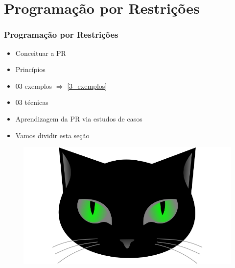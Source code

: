 
       
\section{Programação por Restrições}



\begin{frame}
\frametitle{Programação por Restrições}
\begin{minipage}{0.47\textwidth}
    \begin{itemize}
        \item Conceituar a PR
        \item Princípios
        \item 03 exemplos $\Rightarrow$ \ref{3_exemplos}
        \item 03 técnicas
        \item Aprendizagem da PR via estudos de casos
        \item Vamos dividir esta seção 
    \end{itemize}
\end{minipage}
\begin{minipage}{0.5\textwidth}
\begin{figure}[ht!]
\begin{center}
\includegraphics[width=1.2\textwidth, height=0.40\textheight]{figures/logo_picat_alex.jpg}
\end{center}
\end{figure}
\end{minipage}
\end{frame}



